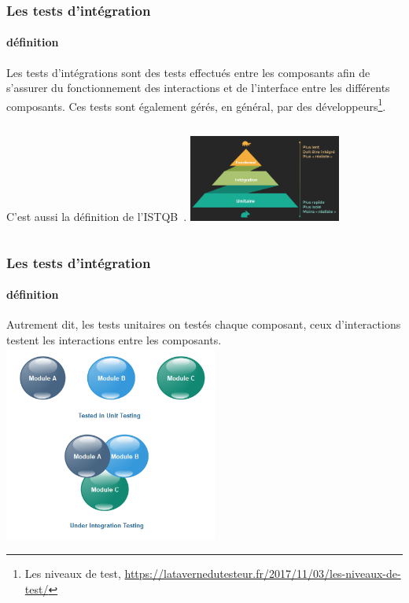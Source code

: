 \documentclass{beamer}
\begin{document}
    \begin{frame}
        \transdissolve
        \frametitle{Les tests d'intégration}
        \framesubtitle{définition}
        Les tests d’intégrations sont des tests effectués entre les composants afin de s’assurer du fonctionnement des interactions et de l’interface entre les différents composants.
        Ces tests sont également gérés, en général, par des développeurs\footnote{Les niveaux de test, \url{https://latavernedutesteur.fr/2017/11/03/les-niveaux-de-test/}}.
        \begin{columns}
            C'est aussi la définition de l'ISTQB\footnotemark~.
            \centering
            \includegraphics[width=5cm]{image/classic-test-pyramid}
        \end{columns}
    \end{frame}

    \begin{frame}
        \transdissolve
        \frametitle{Les tests d'intégration}
        \framesubtitle{définition}
        Autrement dit, les tests unitaires on testés chaque composant, ceux d'interactions testent les interactions entre les composants.
        \bigbreak
        \centering
        \includegraphics[width=7cm]{image/integration-testing-vs-unit-testing}
    \end{frame}
\end{document}

